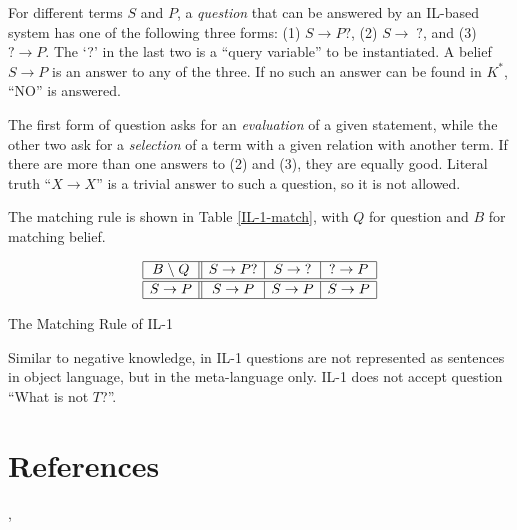 \begin{defi}
For different terms $S$ and $P$, a {\em question} that can be answered by an IL-based system has one of the following three forms: (1) \(S \rightarrow P ?\), (2) \(S \rightarrow\; ?\), and (3) \(? \rightarrow P\).  The `?' in the last two is a ``query variable'' to be instantiated. A belief \(S \rightarrow P\) is an answer to any of the three.  If no such an answer can be found in $K^*$, ``NO'' is answered.
\end{defi}
The first form of question asks for an \emph{evaluation} of a given statement, while the other two ask for a \emph{selection} of a term with a given relation with another term.  If there are more than one answers to (2) and (3), they are equally good. Literal truth ``\(X \rightarrow X\)'' is a trivial answer to such a question, so it is not allowed.

The matching rule is shown in Table \ref{IL-1-match}, with $Q$ for question and $B$ for matching belief.

\begin{table}[htb]
\[\begin{array}{|c||c|c|c|} \hline
B \; \backslash \; Q  & S \rightarrow P ? & S \rightarrow\; ? & ? \rightarrow P \\
\hline \hline
S \rightarrow P & S \rightarrow P & S \rightarrow P & S \rightarrow P \\
\hline \end{array}\]
\caption{The Matching Rule of IL-1}
\label{IL-1-match}
\end{table}

Similar to negative knowledge, in IL-1 questions are not represented as sentences in object language, but in the meta-language only. IL-1 does not accept question ``What is not $T$?''.

\section*{References}

\cite[Chapter 3]{wp:book1}, \cite{wp:nal2,wp:phd}
